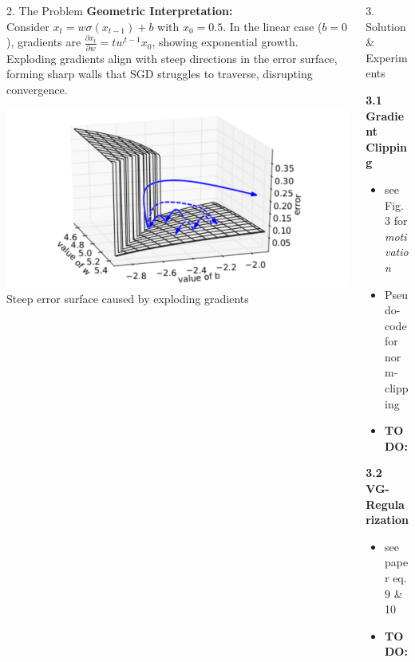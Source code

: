 \documentclass[final]{beamer}
\newcommand{\todo}[1]{\textcolor{myred}{\textbf{TODO:} #1}}
\begin{document}
\begin{frame}[t]
\begin{columns}[t,totalwidth=\textwidth]
\begin{column}{0.33\textwidth}
\begin{block}{2. The Problem}
    \vspace{0.5em}
    \textbf{Geometric Interpretation:} \\
    Consider $x_t = w\sigma(x_{t-1}) + b$ with $x_0 = 0.5$. In the linear case ($b = 0$), gradients are $\frac{\partial x_t}{\partial w} = t w^{t-1} x_0$, showing exponential growth. Exploding gradients align with steep directions in the error surface, forming sharp walls that SGD struggles to traverse, disrupting convergence.

    \begin{center}
        \includegraphics[width=0.9\linewidth]{figures/geometric.png} \\
        \small Steep error surface caused by exploding gradients
    \end{center}

    \end{block}
\end{column}



    \begin{column}{0.33\textwidth}
    \begin{block}{3. Solution \& Experiments}
  
      \textbf{3.1 Gradient Clipping}
      \begin{itemize}
        \item see Fig. 3 for \textit{motivation}
        \item Pseudo-code for norm-clipping
        \item \todo{}
      \end{itemize}
  
      \vspace{0.5em}
      \textbf{3.2 VG-Regularization}
      \begin{itemize}
        \item see paper eq. 9 \& 10
        \item  \todo{}
      \end{itemize}
  

\end{block}
\end{column}
\end{columns}
\end{frame}
\end{document}
